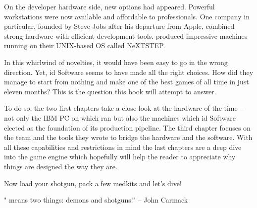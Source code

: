  \par
 On the developer hardware side, new options had appeared. Powerful workstations were now available and affordable to professionals. One company in particular, founded by Steve Jobs after his departure from Apple, combined strong hardware with efficient development tools. \NeXT produced impressive machines running on their UNIX-based OS called NeXTSTEP.\\%
 \par
 In this whirlwind of novelties, it would have been easy to go in the wrong direction. Yet, id Software seems to have made all the right choices. How did they manage to start from nothing and make one of the best games of all time in just eleven months? This is the question this book will attempt to answer.\\
 \par
 To do so, the two first chapters take a close look at the hardware of the time -- not only the IBM PC on which \doom{} ran but also the \NeXT machines which id Software elected as the foundation of its production pipeline. The third chapter focuses on the team and the tools they wrote to bridge the hardware and the software. With all these capabilities and restrictions in mind the last chapters are a deep dive into the game engine which hopefully will help the reader to appreciate why things are designed the way they are.\\
\par
Now load your shotgun, pack a few medkits and let's dive!\\
\par
\centering "\doom{} means two things: demons and shotguns!" -- John Carmack

